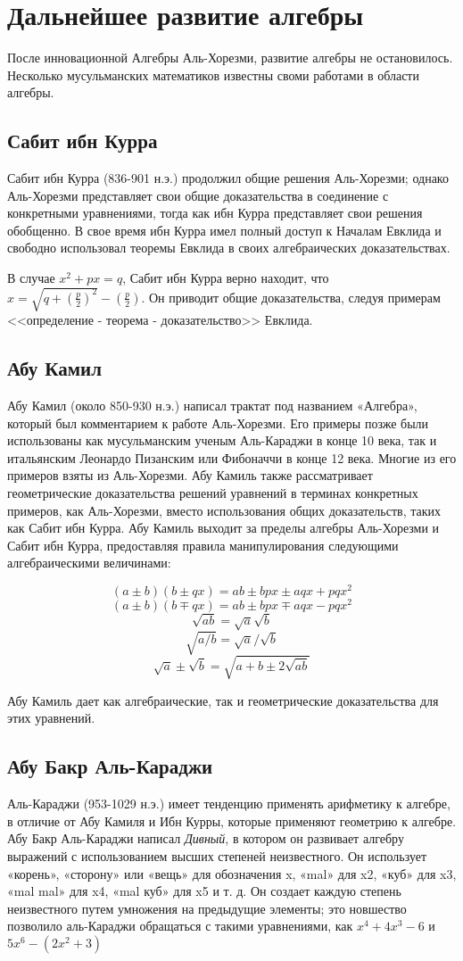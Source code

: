 \section{Дальнейшее развитие алгебры}
После инновационной Алгебры Аль-Хорезми, развитие алгебры не остановилось. Несколько мусульманских математиков известны своми работами в области алгебры.

\subsection{Сабит ибн Курра}
Сабит ибн Курра (836-901 н.э.) продолжил общие решения Аль-Хорезми; однако Аль-Хорезми представляет свои общие доказательства в
соединение с конкретными уравнениями, тогда как ибн Курра представляет свои решения обобщенно. В свое время ибн Курра имел полный доступ к Началам Евклида и свободно использовал теоремы Евклида в своих алгебраических доказательствах. 

В случае $x^2 + px = q$, Сабит ибн Курра верно находит, что $x = \sqrt{q + (\frac{p}{2})^2} - (\frac{p}{2})$. Он приводит общие доказательства, следуя примерам <<определение - теорема - доказательство>> Евклида.

\subsection{Абу Камил}
Абу Камил (около 850-930 н.э.) написал трактат под названием «Алгебра», который был комментарием к работе Аль-Хорезми. Его примеры позже были использованы как мусульманским ученым Аль-Караджи в конце 10 века, так и итальянским Леонардо Пизанским или Фибоначчи в конце 12 века. Многие из его примеров взяты из Аль-Хорезми. Абу Камиль также рассматривает геометрические доказательства решений уравнений в терминах конкретных примеров, как Аль-Хорезми, вместо использования общих доказательств, таких как Сабит ибн Курра. Абу Камиль выходит за пределы алгебры Аль-Хорезми и Сабит ибн Курра, предоставляя правила манипулирования следующими алгебраическими величинами:

$$(a \pm b)(b \pm qx) = ab \pm bpx \pm aqx + pqx^2$$
$$(a \pm b)(b \mp qx) = ab \pm bpx \mp aqx - pqx^2$$
$$\sqrt{ab} = \sqrt{a}\sqrt{b}$$
$$\sqrt{a/b} = \sqrt{a}/\sqrt{b}$$
$$\sqrt{a} \pm \sqrt{b} = \sqrt{a + b \pm 2\sqrt{ab}}$$

Абу Камиль дает как алгебраические, так и геометрические доказательства для этих уравнений.

\subsection{Абу Бакр Аль-Караджи}
Аль-Караджи (953-1029 н.э.) имеет тенденцию применять арифметику к алгебре, в отличие от Абу Камиля и Ибн Курры, которые применяют геометрию к алгебре. Абу Бакр Аль-Караджи написал \textit{Дивный}, в котором он развивает алгебру выражений с использованием высших степеней неизвестного. Он использует «корень», «сторону» или «вещь» для обозначения x, «mal» для x2, «куб» для x3, «mal mal» для x4, «mal куб» для x5 и т. д. Он создает каждую степень неизвестного путем умножения на предыдущие элементы; это новшество позволило аль-Караджи обращаться с такими уравнениями, как $x^4 + 4x^3 - 6$ и $5x^6 - (2x^2 + 3)$

